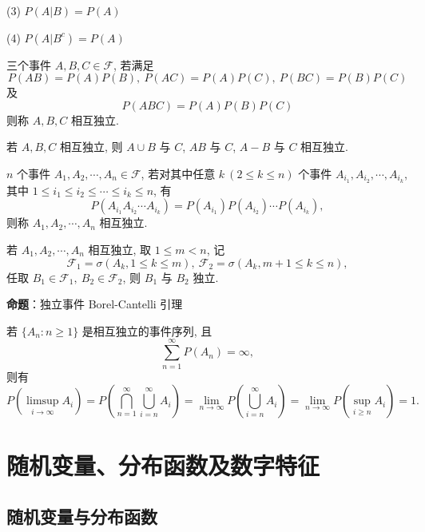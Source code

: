 \documentclass[openany]{ctexbook}
\theoremstyle{kaiti}
\theoremstyle{normal}
\begin{document}
(3) $P(A|B)=P(A)$

(4) $P(A|B^c)=P(A)$

三个事件 $A,B,C\in\mathcal{F}$, 若满足
\begin{equation}
  P(AB)=P(A)P(B),~P(AC)=P(A)P(C),~P(BC)=P(B)P(C)
\end{equation}
 及
\begin{equation}
  P(ABC)=P(A)P(B)P(C)
\end{equation}
 则称 $A,B,C$ 相互独立. 

若 $A,B,C$ 相互独立, 则 $A\cup B$ 与 $C$, $AB$ 与 $C$, $A-B$ 与 $C$ 相互独立.

$n$ 个事件 $A_1,A_2,\cdots,A_n\in\mathcal{F}$, 若对其中任意 $k~(2\leqslant k\leqslant n)$ 个事件 $A_{i_1},A_{i_2},\cdots,A_{i_k}$, 其中 $1\leqslant i_1\leqslant i_2\leqslant\cdots\leqslant i_k\leqslant n$, 有
\begin{equation}
  P(A_{i_1}A_{i_2}\cdots A_{i_k})=P(A_{i_1})P(A_{i_2})\cdots P(A_{i_k}),
\end{equation}
 则称 $A_1,A_2,\cdots,A_n$ 相互独立. 

若 $A_1,A_2,\cdots,A_n$ 相互独立, 取 $1\leqslant m<n$, 记
\begin{equation}
  \mathcal{F}_1=\sigma(A_k,1\leqslant k\leqslant m),~\mathcal{F}_2=\sigma(A_k,m+1\leqslant k\leqslant n),
\end{equation}
 任取 $B_1\in\mathcal{F}_1,~B_2\in\mathcal{F}_2$, 则 $B_1$ 与 $B_2$ 独立.

\textbf{命题}：独立事件 Borel-Cantelli 引理

若 $\{A_n:n\geqslant1\}$ 是相互独立的事件序列, 且
\begin{equation}
  \sum_{n=1}^\infty P(A_n)=\infty,
\end{equation}
 则有
\begin{equation}
  P\left(\limsup_{i\to\infty}A_i\right)=P\left(\bigcap_{n=1}^\infty\bigcup_{i=n}^\infty A_i\right)=\lim_{n\to\infty}P\left(\bigcup_{i=n}^\infty A_i\right)=\lim_{n\to\infty}P\left(\sup_{i\geqslant n} A_i\right)=1.
\end{equation}


\section{随机变量、分布函数及数字特征}

\subsection{随机变量与分布函数}
\end{document}

